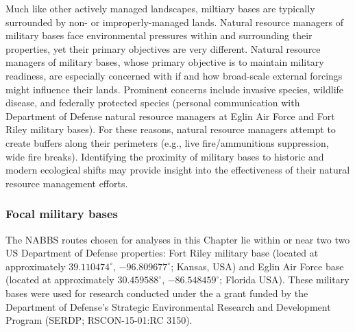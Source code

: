 \documentclass[12pt,twoside,openany]{reedthesis}
\begin{document}
Much like other actively managed landscapes, miltiary bases are typically surrounded by non- or improperly-managed lands. Natural resource managers of military bases face environmental pressures within and surrounding their properties, yet their primary objectives are very different. Natural resource managers of military bases, whose primary objective is to maintain military readiness, are especially concerned with if and how broad-scale external forcings might influence their lands. Prominent concerns include invasive species, wildlife disease, and federally protected species (personal communication with Department of Defense natural resource managers at Eglin Air Force and Fort Riley military bases). For these reasons, natural resource managers attempt to create buffers along their perimeters (e.g., live fire/ammunitions suppression, wide fire breaks). Identifying the proximity of military bases to historic and modern ecological shifts may provide insight into the effectiveness of their natural resource management efforts.

\hypertarget{focal-military-bases}{%
\subsubsection{Focal military bases}\label{focal-military-bases}}

The NABBS routes chosen for analyses in this Chapter lie within or near two two US Department of Defense properties: Fort Riley military base (located at approximately \(39.110474^{\circ}\), \(-96.809677^{\circ}\); Kansas, USA) and Eglin Air Force base (located at approximately \(30.459588^{\circ}\), \(-86.548459^{\circ}\); Florida USA). These military bases were used for research conducted under the a grant funded by the Department of Defense's Strategic Environmental Research and Development Program (SERDP; RSCON-15-01:RC 3150).
\end{document}
